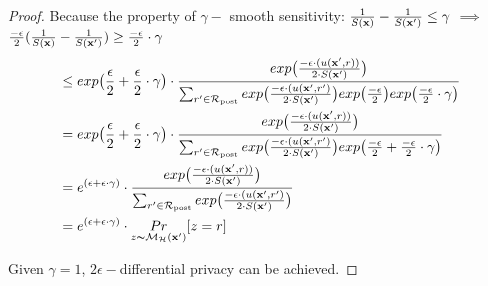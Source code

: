 \documentclass{article}
\begin{document}
\begin{proof}
  Because the property of $\gamma -$ smooth sensitivity: $\frac{1}{S(\textbf{x})} - \frac{1}{S(\textbf{x}')} \leq \gamma$ $\implies$
  $\frac{- \epsilon}{2}
  (\frac{1}{S(\textbf{x})}-
  \frac{1}{S(\textbf{x}')}) \geq \frac{- \epsilon}{2} \cdot \gamma$
  \begin{equation*}
  \begin{split}
  & \leq exp\big( \frac{\epsilon}{2} + \frac{\epsilon}{2} \cdot \gamma\big) \cdot 
  \frac {
  exp
  \big(
  \frac{-\epsilon\cdot(u(\textbf{x}', {r}))}{2\cdot S(\textbf{x}')}
  \big)
  } 
  {
  \sum_{r'\in \mathcal{R}_{\textup{post}}} 
  exp 
  \big(
  \frac{-\epsilon\cdot(u(\textbf{x}', {r'})}{2 \cdot S(\textbf{x}')}
  \big)
  exp 
  \big(
  \frac{-\epsilon}{2}
  \big)
  exp
  \big(
  \frac{- \epsilon}{2} \cdot \gamma
  \big)
  }\\
  & = exp\big( \frac{\epsilon}{2} + \frac{\epsilon}{2} \cdot \gamma\big) \cdot 
  \frac {
  exp
  \big(
  \frac{-\epsilon\cdot(u(\textbf{x}', {r}))}{2\cdot S(\textbf{x}')}
  \big)
  } 
  {
  \sum_{r'\in \mathcal{R}_{\textup{post}}} 
  exp 
  \big(
  \frac{-\epsilon\cdot(u(\textbf{x}', {r'})}{2 \cdot S(\textbf{x}')}
  \big)
  exp 
  \big(
  \frac{-\epsilon}{2} +   \frac{- \epsilon}{2} \cdot \gamma
  \big)
  }\\
  & = e^{(\epsilon + \epsilon \cdot \gamma )} \cdot 
  \frac {
  exp
  \big(
  \frac{-\epsilon\cdot(u(\textbf{x}', {r}))}{2\cdot S(\textbf{x}')}
  \big)
  } 
  {
  \sum_{r'\in \mathcal{R}_{\textup{post}}} 
  exp 
  \big(
  \frac{-\epsilon\cdot(u(\textbf{x}', {r'})}{2 \cdot S(\textbf{x}')}
  \big)
  }\\
  & = e^{( \epsilon + \epsilon \cdot \gamma )} \cdot   \underset{z \thicksim \mathcal{M}_{\mathcal{H}}(\textbf{x}')}{Pr}[z = r]
  \end{split}
  \end{equation*}

  Given $\gamma = 1$, $2\epsilon - $differential privacy can be achieved.
\end{proof}



\end{document}
